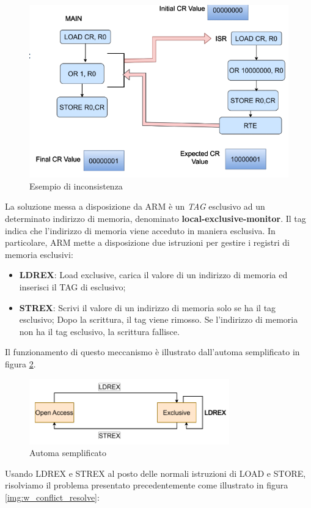 \begin{figure}[ht]
    \centering
    \includegraphics[width=.7\textwidth]{img/Conflitct_example.png}
    \caption{Esempio di inconsistenza}
    \label{img:w_conflict}
\end{figure}

La soluzione messa a disposizione da ARM è un \textit{TAG} esclusivo ad un determinato indirizzo di memoria, denominato \textbf{local-exclusive-monitor}. Il tag indica che l'indirizzo di memoria viene acceduto in maniera esclusiva. In particolare, ARM mette a disposizione due istruzioni per gestire i registri di memoria esclusivi:
\begin{itemize}
    \item \textbf{LDREX}: Load exclusive, carica il valore di un indirizzo di memoria ed inserisci il TAG di esclusivo;
    \item \textbf{STREX}: Scrivi il valore di un indirizzo di memoria solo se ha il tag esclusivo; Dopo la scrittura, il tag viene rimosso. Se l'indirizzo di memoria non ha il tag esclusivo, la scrittura fallisce.
\end{itemize}

Il funzionamento di questo meccanismo è illustrato dall'automa semplificato in figura \ref{img:automa_exclusive}.

\begin{figure}[ht]
    \centering
    \includegraphics[width=.4\textwidth]{img/automa_exclusive.png}
    \caption{Automa semplificato}
    \label{img:automa_exclusive}
\end{figure}

Usando LDREX e STREX al posto delle normali istruzioni di LOAD e STORE, risolviamo il problema presentato precedentemente come illustrato in figura \ref{img:w_conflict_resolve}:

